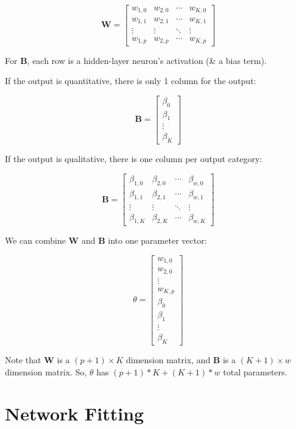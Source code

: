 \documentclass[
]{book}
\begin{document}
\[
\mathbf W =
\begin{bmatrix}
w_{1, 0} & w_{2, 0} & \cdots & w_{K, 0} \\
w_{1, 1} & w_{2, 1} & \cdots & w_{K, 1} \\
\vdots & \vdots & \ddots & \vdots \\
w_{1, p} & w_{2, p} & \cdots & w_{K, p}
\end{bmatrix}
\]

For \textbf{B}, each row is a hidden-layer neuron's activation (\& a bias term).

If the output is quantitative, there is only 1 column for the output:

\[
\mathbf B =
\begin{bmatrix}
\beta_{0} \\
\beta_{1} \\
\vdots \\
\beta_{K}
\end{bmatrix}
\]

If the output is qualitative, there is one column per output category:

\[
\mathbf B =
\begin{bmatrix}
\beta_{1, 0} & \beta_{2, 0} & \cdots & \beta_{w, 0} \\
\beta_{1, 1} & \beta_{2, 1} & \cdots & \beta_{w, 1} \\
\vdots & \vdots & \ddots & \vdots \\
\beta_{1, K} & \beta_{2, K} & \cdots & \beta_{w, K}
\end{bmatrix}
\]

We can combine \textbf{W} and \textbf{B} into one parameter vector:

\[
\theta =
\begin{bmatrix}
w_{1, 0} \\
w_{2, 0} \\
\vdots \\
w_{K, p} \\
\beta_{0} \\
\beta_{1} \\
\vdots \\
\beta_{K}
\end{bmatrix}
\]

Note that \textbf{W} is a \((p + 1)\times K\) dimension matrix, and \textbf{B} is a \((K + 1)\times w\) dimension matrix. So, \(\theta\) has \((p + 1) * K + (K + 1) * w\) total parameters.

\hypertarget{network-fitting}{%
\section{Network Fitting}\label{network-fitting}}
\end{document}
